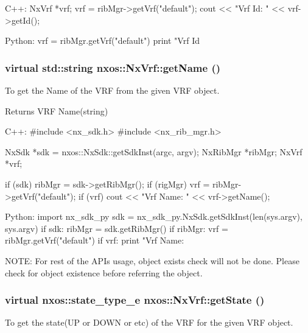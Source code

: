 \begin{DoxyCode}
  C++:
       NxVrf *vrf;
       vrf = ribMgr->getVrf("default");
       cout << "Vrf Id: " << vrf->getId();

  Python:
       vrf = ribMgr.getVrf("default")
       print "Vrf Id %
\end{DoxyCode}
 \hypertarget{classnxos_1_1NxVrf_a276a8d8170f372089a5653bdd7febfde}{
\subsubsection[{getName}]{\setlength{\rightskip}{0pt plus 5cm}virtual std::string nxos::NxVrf::getName ()}}
\label{classnxos_1_1NxVrf_a276a8d8170f372089a5653bdd7febfde}
To get the Name of the VRF from the given VRF object.

\begin{DoxyReturn}{Returns}
VRF Name(string)
\end{DoxyReturn}

\begin{DoxyCode}
  C++:
       #include <nx_sdk.h>
       #include <nx_rib_mgr.h>

       NxSdk    *sdk = nxos::NxSdk::getSdkInst(argc, argv);
       NxRibMgr *ribMgr;
       NxVrf    *vrf;

       if (sdk) {
           ribMgr = sdk->getRibMgr();
           if (rigMgr) {
               vrf = ribMgr->getVrf("default");
               if (vrf) {
                   cout << "Vrf Name: " << vrf->getName();
               }
           }
       }

  Python:
       import nx_sdk_py
       sdk = nx_sdk_py.NxSdk.getSdkInst(len(sys.argv), sys.argv)
       if sdk:
          ribMgr = sdk.getRibMgr()
          if ribMgr:
             vrf = ribMgr.getVrf("default")
             if vrf:
                print "Vrf Name: %
\end{DoxyCode}
 NOTE: For rest of the APIs usage, object exists check will not be done. Please check for object existence before referring the object. \hypertarget{classnxos_1_1NxVrf_a443e508684e9804f14cc3526302ac8b4}{
\subsubsection[{getState}]{\setlength{\rightskip}{0pt plus 5cm}virtual nxos::state\_\-type\_\-e nxos::NxVrf::getState ()}}
\label{classnxos_1_1NxVrf_a443e508684e9804f14cc3526302ac8b4}
To get the state(UP or DOWN or etc) of the VRF for the given VRF object.


